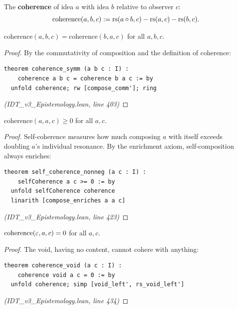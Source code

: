 \begin{definition}[Coherence]
\label{def:coherence}
The \textbf{coherence} of idea $a$ with idea $b$ relative to observer $c$:
\[
  \mathrm{coherence}(a, b, c) := \mathrm{rs}(a \circ b, c) - \mathrm{rs}(a, c) - \mathrm{rs}(b, c).
\]
\end{definition}

\begin{theorem}
\label{thm:coherence-symm}
$\mathrm{coherence}(a, b, c) = \mathrm{coherence}(b, a, c)$ for all $a, b, c$.
\end{theorem}

\begin{proof}
By the commutativity of composition and the definition of coherence:
\begin{lstlisting}
theorem coherence_symm (a b c : I) :
    coherence a b c = coherence b a c := by
  unfold coherence; rw [compose_comm']; ring
\end{lstlisting}
\textit{(IDT\_v3\_Epistemology.lean, line 403)}
\end{proof}

\begin{theorem}
\label{thm:self-coherence-nonneg}
$\mathrm{coherence}(a, a, c) \geq 0$ for all $a, c$.
\end{theorem}

\begin{proof}
Self-coherence measures how much composing $a$ with itself exceeds doubling $a$'s
individual resonance. By the enrichment axiom, self-composition always enriches:
\begin{lstlisting}
theorem self_coherence_nonneg (a c : I) :
    selfCoherence a c >= 0 := by
  unfold selfCoherence coherence
  linarith [compose_enriches a a c]
\end{lstlisting}
\textit{(IDT\_v3\_Epistemology.lean, line 423)}
\end{proof}

\begin{theorem}
\label{thm:coherence-void}
$\mathrm{coherence}(\varepsilon, a, c) = 0$ for all $a, c$.
\end{theorem}

\begin{proof}
The void, having no content, cannot cohere with anything:
\begin{lstlisting}
theorem coherence_void (a c : I) :
    coherence void a c = 0 := by
  unfold coherence; simp [void_left', rs_void_left']
\end{lstlisting}
\textit{(IDT\_v3\_Epistemology.lean, line 434)}
\end{proof}

